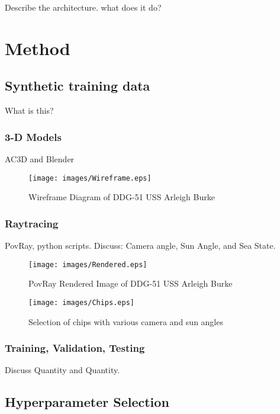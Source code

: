 \documentclass{article}
\begin{document}
Describe the architecture.
what does it do?

\section{Method\label{sec:method}}

\subsection{Synthetic training data}
What is this?

\subsubsection{3-D Models}
AC3D and Blender

\begin{figure}
  \begin{center}
    \texttt{[image: images/Wireframe.eps]}
    \caption{Wireframe Diagram of DDG-51 USS Arleigh Burke}
    \label{fig:threelayer}
  \end{center}
\end{figure}

\subsubsection{Raytracing}
PovRay, python scripts. Discuss: Camera angle, Sun Angle, and Sea State.

\begin{figure}
  \begin{center}
    \texttt{[image: images/Rendered.eps]}
    \caption{PovRay Rendered Image of DDG-51 USS Arleigh Burke}
    \label{fig:threelayer}
  \end{center}
\end{figure}
\begin{figure}
  \begin{center}
    \texttt{[image: images/Chips.eps]}
    \caption{Selection of chips with various camera and sun angles}
    \label{fig:threelayer}
  \end{center}
\end{figure}

\subsubsection{Training, Validation, Testing}
Discuss Quantity and Quantity.

\subsection{Hyperparameter Selection}
\end{document}
